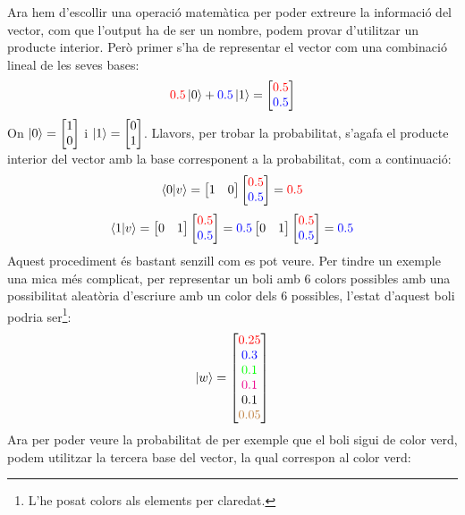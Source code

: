 Ara hem d'escollir una operació matemàtica per poder extreure la informació del vector, com que l'output ha de ser un nombre, podem provar d'utilitzar un producte interior. Però primer s'ha de representar el vector com una combinació lineal de les seves bases:
$$
\textcolor{red}{0.5}\ket{0} + \textcolor{blue}{0.5}\ket{1} = \begin{bmatrix}
	\textcolor{red}{0.5} \\
	\textcolor{blue}{0.5}
\end{bmatrix}
$$
On $\ket{0} = \begin{bmatrix} 1 \\ 0\end{bmatrix}$ i $\ket{1} = \begin{bmatrix} 0 \\ 1 \end{bmatrix}$.
Llavors, per trobar la probabilitat, s'agafa el producte interior del vector amb la base corresponent a la probabilitat, com a continuació:
$$
\bra{0}\ket{v} =
\begin{bmatrix}
	1 &
	0
\end{bmatrix}
\begin{bmatrix}
	\textcolor{red}{0.5} \\
	\textcolor{blue}{0.5}
\end{bmatrix}
= \textcolor{red}{0.5}
$$
$$
\bra{1}\ket{v} =
\begin{bmatrix}
	0 &
	1
\end{bmatrix}
\begin{bmatrix}
	\textcolor{red}{0.5} \\
	\textcolor{blue}{0.5}
\end{bmatrix}
= \textcolor{blue}{0.5}
	\begin{bmatrix}
		0 &
		1
	\end{bmatrix}
	\begin{bmatrix}
		\textcolor{red}{0.5} \\
		\textcolor{blue}{0.5}
	\end{bmatrix}
	= \textcolor{blue}{0.5}
$$
Aquest procediment és bastant senzill com es pot veure. Per tindre un exemple una mica més complicat, per representar un boli amb 6 colors possibles amb una possibilitat aleatòria d'escriure amb un color dels 6 possibles, l'estat d'aquest boli podria ser\footnote{L'he posat colors als elements per claredat.}:
$$
\ket{w} =
\begin{bmatrix}
	\textcolor{red}{0.25} \\
	\textcolor{blue}{0.3 }\\
	\textcolor{green}{0.1 }\\
	\textcolor{magenta}{0.1 }\\
	\textcolor{black}{0.1 }\\
	\textcolor{brown}{0.05}
\end{bmatrix}
$$
Ara per poder veure la probabilitat de per exemple que el boli sigui de color verd, podem utilitzar la tercera base del vector, la qual correspon al color verd:

